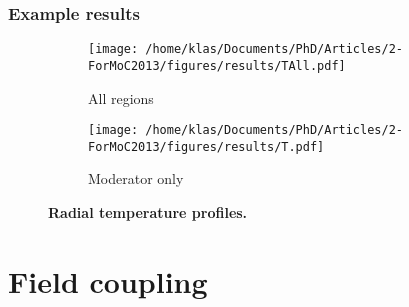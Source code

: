 \documentclass[9pt,handout]{beamer} %
\begin{document}
\begin{frame}%
\frametitle{Example results}
\vspace{16pt}
\begin{figure}[!htb]
\centering
\begin{subfigure}{0.46\textwidth}
\centering
\texttt{[image: /home/klas/Documents/PhD/Articles/2-ForMoC2013/figures/results/TAll.pdf]}
\caption{All regions}
\end{subfigure}
\begin{subfigure}{0.46\textwidth}
\centering
\texttt{[image: /home/klas/Documents/PhD/Articles/2-ForMoC2013/figures/results/T.pdf]}
\caption{Moderator only}
\end{subfigure}
\caption{\bf Radial temperature profiles.} 
\end{figure}
\end{frame}





\section{Field coupling}
\end{document}
